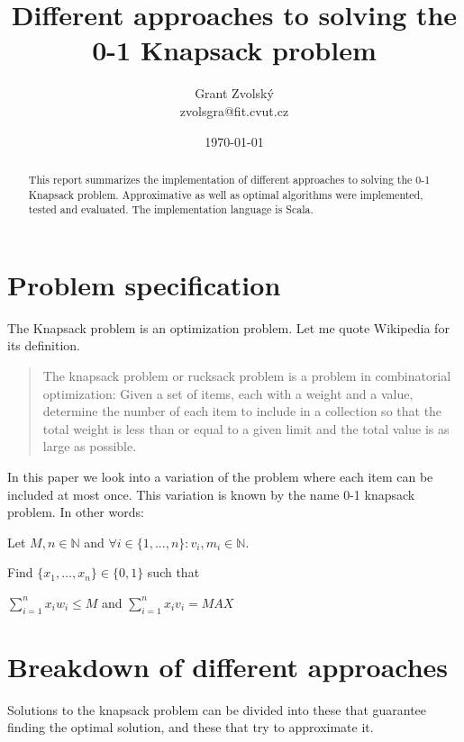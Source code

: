 \documentclass[a4paper,10pt,twocolumn]{article}
\title{Different approaches to solving the 0-1 Knapsack problem}
\date{\today}
\author{Grant Zvolský \\ zvolsgra@fit.cvut.cz}
\begin{document}
\maketitle
\begin{abstract}
This report summarizes the implementation of different approaches to solving the 0-1 Knapsack problem. Approximative
 as well as optimal algorithms were implemented, tested and evaluated. The implementation language is Scala.
\end{abstract}

\section{Problem specification} %
The Knapsack problem is an optimization problem. Let me quote Wikipedia for its definition.

\begin{quote}
The knapsack problem or rucksack problem is a problem in combinatorial optimization:
Given a set of items, each with a weight and a value, determine the number of each item
to include in a collection so that the total weight is less than or equal to a given limit
and the total value is as large as possible.\cite{wikiKnapsack}
\end{quote}

In this paper we look into a variation of the problem where each item can be included
at most once. This variation is known by the name 0-1 knapsack problem. In other words:

Let $M, n\in\mathbb{N}$ and $\forall i\in\{1, ..., n\}:v_i, m_i\in\mathbb{N}$.

Find $\{x_1, ..., x_n\}\in\{0, 1\}$
such that

\vspace{0.4em}
{\centering
$\sum_{i=1}^{n} x_i w_i \le M$ \quad and \quad $\sum_{i=1}^{n} x_i v_i = MAX$

}

\section{Breakdown of different approaches} %
Solutions to the knapsack problem can be divided into these that guarantee finding the optimal solution, and these that
try to approximate it.
\end{document}
